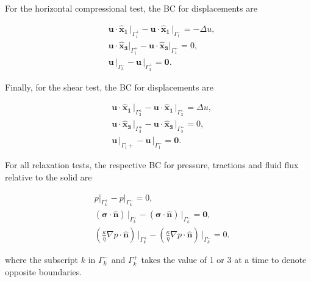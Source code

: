 \documentclass[draft]{agujournal2019}
\begin{document}
For the horizontal compressional test, the BC for displacements are
\begin{linenomath*}
\begin{equation}\label{Eq.9}
\begin{split}
& \bm{u} \cdot \bm{\hat{x}_1}\, \vert_{\Gamma_1^+}-\bm{u} \cdot \bm{\hat{x}_1}\, \vert_{\Gamma_1^-} = - \Delta u, \\
& \bm{u} \cdot \bm{\hat{x}_3} \vert_{\Gamma_1^+}- \bm{u} \cdot \bm{\hat{x}_3}\vert_{\Gamma_1^-} =  0,  \\
& \bm{u}\,\vert_{\Gamma_3^-}- \bm{u}\,\vert_{\Gamma_3^+} = \bm{0}.
\end{split}
\end{equation}
\end{linenomath*}

Finally, for the shear test, the BC for displacements are
\begin{linenomath*}
\begin{equation}\label{Eq.10}
\begin{split}
& \bm{u} \cdot \bm{\hat{x}_1}\,\vert_{\Gamma_3^+}- \bm{u} \cdot \bm{\hat{x}_1} \,\vert_{\Gamma_3^-} =\Delta u,\\
& \bm{u} \cdot \bm{\hat{x}_3}\,\vert_{\Gamma_3^+}- \bm{u} \cdot \bm{\hat{x}_3}\,\vert_{\Gamma_3^-} = 0, \\
& \bm{u}\,\vert_{\Gamma_1+}- \bm{u}\,\vert_{\Gamma_1^-} =\bm{0}.
\end{split}
\end{equation}
\end{linenomath*}

For all relaxation tests, the respective BC for pressure, tractions and fluid flux relative to the solid are
\begin{linenomath*}
\begin{equation}\label{Eq.11}
\begin{split}
& p\vert_{\Gamma_k^+}-p\vert_{\Gamma_k^-} =0, \\
& \left(\bm{\sigma}\cdot \bm{\hat n} \right)\, \vert_{\Gamma_k^+}-\left(\bm{\sigma}\cdot \bm{\hat n} \right)\, \vert_{\Gamma_k^-} = \bm{0},\\
&\left( \frac{\kappa}{\eta} \nabla p \cdot \bm{\hat n} \right) \, \vert_{\Gamma_k^+} -\left( \frac{\kappa}{\eta} \nabla p \cdot \bm{\hat n} \right) \, \vert_{\Gamma_k^-} = 0.
\end{split}
\end{equation}
\end{linenomath*}
where the subscript $k$ in $\Gamma_k^-$ and $\Gamma_k^+$ takes the value of 1 or 3 at a time to denote opposite boundaries.
\end{document}
